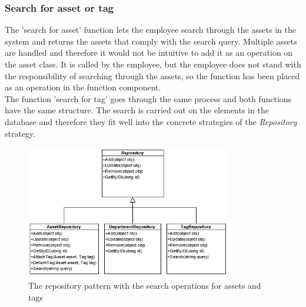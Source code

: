 \subsubsection{Search for asset or tag}
The 'search for asset' function lets the employee search through the assets in the system and returns the assets that comply with the search query. Multiple assets are handled and therefore it would not be intuitive to add it as an operation on the asset class. It is called by the employee, but the employee does not stand with the responsibility of searching through the assets, so the function has been placed as an operation in the function component.\\
The function 'search for tag' goes through the same process and both functions have the same structure. The search is carried out on the elements in the database and therefore they fit well into the concrete strategies of the \textit{Repository} strategy.
\begin{figure}[H]
    \centering
    \includegraphics[width=0.8\textwidth]{figures/FunctionComponent/Repository_pattern_with_search.png}
    \caption{The repository pattern with the search operations for assets and tags}
    \label{fig:RepositoryPatternWithSearch}
\end{figure}

